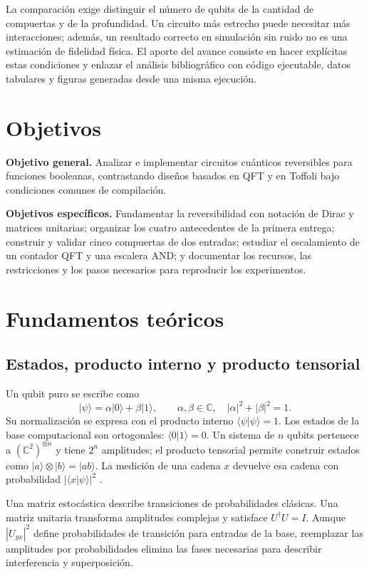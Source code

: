 \documentclass[10pt,a4paper,twocolumn]{article}
\newcommand{\ket}[1]{\lvert #1\rangle}
\begin{document}
La comparación exige distinguir el número de qubits de la cantidad de
compuertas y de la profundidad. Un circuito más estrecho puede necesitar más
interacciones; además, un resultado correcto en simulación sin ruido no es una
estimación de fidelidad física. El aporte del avance consiste en hacer explícitas
estas condiciones y enlazar el análisis bibliográfico con código ejecutable,
datos tabulares y figuras generadas desde una misma ejecución.

\section{Objetivos}
\textbf{Objetivo general.} Analizar e implementar circuitos cuánticos reversibles
para funciones booleanas, contrastando diseños basados en QFT y en Toffoli bajo
condiciones comunes de compilación.

\textbf{Objetivos específicos.} Fundamentar la reversibilidad con notación de
Dirac y matrices unitarias; organizar los cuatro antecedentes de la primera
entrega; construir y validar cinco compuertas de dos entradas; estudiar el
escalamiento de un contador QFT y una escalera AND; y documentar los recursos,
las restricciones y los pasos necesarios para reproducir los experimentos.

\section{Fundamentos teóricos}
\subsection{Estados, producto interno y producto tensorial}
Un qubit puro se escribe como
\begin{equation}
\ket{\psi}=\alpha\ket{0}+\beta\ket{1},\qquad
\alpha,\beta\in\mathbb{C},\quad |\alpha|^2+|\beta|^2=1.
\end{equation}
Su normalización se expresa con el producto interno
$\langle\psi|\psi\rangle=1$. Los estados de la base computacional son
ortogonales: $\langle0|1\rangle=0$. Un sistema de $n$ qubits pertenece a
$(\mathbb{C}^2)^{\otimes n}$ y tiene $2^n$ amplitudes; el producto tensorial
permite construir estados como $\ket{a}\otimes\ket{b}=\ket{ab}$.
La medición de una cadena $x$ devuelve esa cadena con probabilidad
$|\langle x|\psi\rangle|^2$ \cite{nielsen2010}.

Una matriz estocástica describe transiciones de probabilidades clásicas. Una
matriz unitaria transforma amplitudes complejas y satisface $U^\dagger U=I$.
Aunque $|U_{yx}|^2$ define probabilidades de transición para entradas de la base,
reemplazar las amplitudes por probabilidades elimina las fases necesarias para
describir interferencia y superposición.
\end{document}
